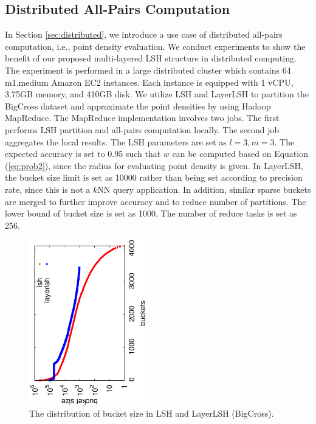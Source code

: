 \subsection{Distributed All-Pairs Computation}
\label{sec:expr:allpair}

In Section \ref{sec:distributed}, we introduce a use case of distributed all-pairs computation, i.e., point density evaluation. We conduct experiments to show the benefit of our proposed multi-layered LSH structure in distributed computing. The experiment is performed in a large distributed cluster which contains 64 m1.medium Amazon EC2 instances. Each instance is equipped with 1 vCPU, 3.75GB memory, and 410GB disk. We utilize LSH and LayerLSH to partition the BigCross dataset and approximate the point densities by using Hadoop MapReduce. The MapReduce implementation involves two jobs. The first performs LSH partition and all-pairs computation locally. The second job aggregates the local results. The LSH parameters are set as $l=3, m=3$. The expected accuracy is set to 0.95 such that $w$ can be computed based on Equation (\ref{eq:prob2}), since the radius for evaluating point density is given. In LayerLSH, the bucket size limit is set as 10000 rather than being set according to precision rate, since this is not a $k$NN query application. In addition, similar sparse buckets are merged to further improve accuracy and to reduce number of partitions. The lower bound of bucket size is set as 1000. The number of reduce tasks is set as 256.

\begin{figure}[t]
    \centerline{\includegraphics[angle=-90, width=2in]{fig/amazon_buckets.eps}}
    \caption{The distribution of bucket size in LSH and LayerLSH (BigCross).}
    \label{fig:amazon_buckets}
\end{figure}

